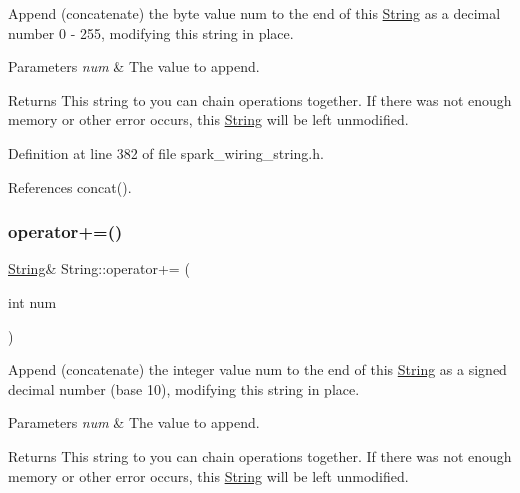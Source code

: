 Append (concatenate) the byte value num to the end of this \hyperlink{class_string}{String} as a decimal number 0 -\/ 255, modifying this string in place. 


\begin{DoxyParams}{Parameters}
{\em num} & The value to append.\\
\hline
\end{DoxyParams}
\begin{DoxyReturn}{Returns}
This string to you can chain operations together. If there was not enough memory or other error occurs, this \hyperlink{class_string}{String} will be left unmodified. 
\end{DoxyReturn}


Definition at line 382 of file spark\+\_\+wiring\+\_\+string.\+h.



References concat().

\mbox{\label{class_string_acc979c8832f66d8d953aaa7d81d305c1}} 
\subsubsection{\texorpdfstring{operator+=()}{operator+=()}\hspace{0.1cm}{\footnotesize\ttfamily [5/8]}}
{\footnotesize\ttfamily \hyperlink{class_string}{String}\& String\+::operator+= (\begin{DoxyParamCaption}\item[{int}]{num }\end{DoxyParamCaption})\hspace{0.3cm}{\ttfamily [inline]}}



Append (concatenate) the integer value num to the end of this \hyperlink{class_string}{String} as a signed decimal number (base 10), modifying this string in place. 


\begin{DoxyParams}{Parameters}
{\em num} & The value to append.\\
\hline
\end{DoxyParams}
\begin{DoxyReturn}{Returns}
This string to you can chain operations together. If there was not enough memory or other error occurs, this \hyperlink{class_string}{String} will be left unmodified. 
\end{DoxyReturn}


